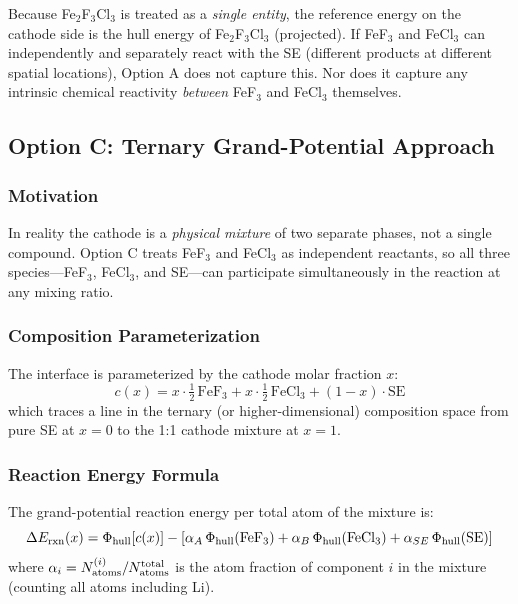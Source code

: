 \documentclass[11pt,letterpaper]{article}
\begin{document}
Because Fe$_2$F$_3$Cl$_3$ is treated as a \emph{single entity}, the
reference energy on the cathode side is the hull energy of Fe$_2$F$_3$Cl$_3$
(projected). If FeF$_3$ and FeCl$_3$ can independently and separately
react with the SE (different products at different spatial locations),
Option A does not capture this. Nor does it capture any intrinsic
chemical reactivity \emph{between} FeF$_3$ and FeCl$_3$ themselves.

\subsection{Option C: Ternary Grand-Potential Approach}

\subsubsection{Motivation}

In reality the cathode is a \emph{physical mixture} of two separate
phases, not a single compound. Option C treats FeF$_3$ and FeCl$_3$
as independent reactants, so all three species---FeF$_3$, FeCl$_3$,
and SE---can participate simultaneously in the reaction at any mixing ratio.

\subsubsection{Composition Parameterization}

The interface is parameterized by the cathode molar fraction $x$:
\begin{equation}
  c(x) = x\!\cdot\!\tfrac{1}{2}\,\text{FeF}_3
        + x\!\cdot\!\tfrac{1}{2}\,\text{FeCl}_3
        + (1-x)\!\cdot\!\text{SE}
  \label{eq:ternary_comp}
\end{equation}
which traces a line in the ternary (or higher-dimensional) composition
space from pure SE at $x=0$ to the 1:1 cathode mixture at $x=1$.

\subsubsection{Reaction Energy Formula}

The grand-potential reaction energy per total atom of the mixture is:
\begin{equation}
  \Delta E_{\rm rxn}(x) =
    \Phi_{\rm hull}\!\left[c(x)\right]
    - \left[
        \alpha_A\,\Phi_{\rm hull}(\text{FeF}_3)
      + \alpha_B\,\Phi_{\rm hull}(\text{FeCl}_3)
      + \alpha_{SE}\,\Phi_{\rm hull}(\text{SE})
      \right]
  \label{eq:ternary_erxn}
\end{equation}
where $\alpha_i = N_{\rm atoms}^{(i)} / N_{\rm atoms}^{\rm total}$ is
the atom fraction of component $i$ in the mixture (counting all atoms
including Li).
\end{document}
